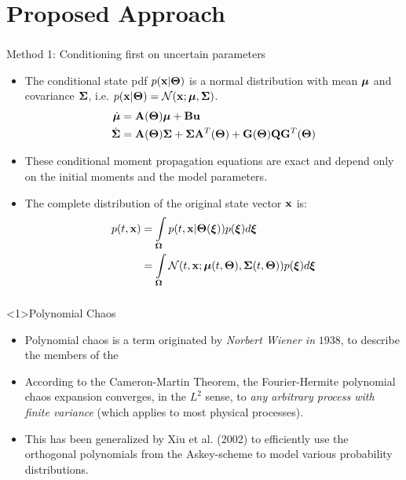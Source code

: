 \documentclass{beamer}
\begin{document}
\section{Proposed Approach}
\begin{frame}\frametitle{\color{black}{Proposed Approach}}\framesubtitle{\color{white}{$\dot{\x} = \A(\Th)\x + \B(\Th)\u+ \G(\Th)\et$}}

\begin{block}{Method 1: Conditioning first on uncertain parameters}
\begin{itemize}
\item The conditional state pdf $p(\mathbf{x}|\boldsymbol{\Theta})$ is a normal distribution with mean $\boldsymbol{\mu}$ and covariance $\boldsymbol{\Sigma}$, i.e. $p(\mathbf{x}|\boldsymbol{\Theta})=\mathcal{N}(\mathbf{x};\boldsymbol{\mu},\boldsymbol{\Sigma})$.
\begin{align}\label{meanG}
\dot{\boldsymbol{\mu}} &=\mathbf{A}(\boldsymbol{\Theta})\boldsymbol{\mu} + \mathbf{B}\mathbf{u}\\
\dot{\boldsymbol{\Sigma}} &= \mathbf{A}(\boldsymbol{\Theta})\boldsymbol{\Sigma}+\boldsymbol{\Sigma}\mathbf{A}^T(\boldsymbol{\Theta})+\mathbf{G}(\boldsymbol{\Theta}) \mathbf{Q} \mathbf{G}^T(\boldsymbol{\Theta}) \label{covG}
\end{align}
\item These conditional moment propagation equations are \alert{exact and depend only} on the initial moments and the model parameters.
\item The complete distribution of the original state vector $\mathbf{x}$ is:\vspace{-0.15in}
\begin{align}\footnotesize
p(t,\mathbf{x}) &= \int\limits_{\boldsymbol{\Omega}}{p(t,\mathbf{x}|\boldsymbol{\Theta}(\boldsymbol{\xi}))p(\boldsymbol{\xi})d\boldsymbol{\xi}}\\
&=\int\limits_{\boldsymbol{\Omega}}\mathcal{N}(t,\mathbf{x};\boldsymbol{\mu}(t,\boldsymbol{\Theta}),\boldsymbol{\Sigma}(t,\boldsymbol{\Theta}))p(\boldsymbol{\xi})d\boldsymbol{\xi} \label{meth2pi}
\end{align}
\end{itemize}
\end{block}
\end{frame}


\begin{frame}\frametitle{\color{black}{Proposed Approach}}\framesubtitle{\color{white}{$\dot{\x} = \A(\Th)\x + \B(\Th)\u+ \G(\Th)\et$}}
\begin{block}<1>{Polynomial Chaos}
\begin{itemize}
\item Polynomial chaos is a term originated by \textit{Norbert Wiener in} $1938$, to describe the members of the {\color{blue}{span of Hermite polynomial functionals of a Gaussian process.}}
\item According to the Cameron-Martin Theorem, the Fourier-Hermite polynomial chaos expansion converges, in the $L^2$ sense, to \textit{any arbitrary process with finite variance} (which applies to most physical processes).
\item This has been generalized by Xiu et al. (2002) to \alert{efficiently use the orthogonal polynomials} from the Askey-scheme to model various probability distributions.
\end{itemize}
\end{block}
\end{frame}
\end{document}
